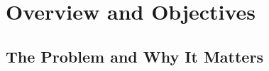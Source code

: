 \documentclass[12pt,letterpaper]{article}
\begin{document}
\thispagestyle{plain}
\renewcommand{\contentsname}{Table of Contents}
\tableofcontents
\clearpage

\setcounter{page}{1}

\section{Overview and Objectives}\label{sec:overview}

\subsection{The Problem and Why It Matters}\label{sec:problem}
\end{document}
